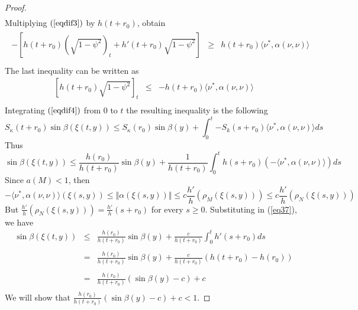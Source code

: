 \documentclass[a4paper]{amsart}
\theoremstyle{definition}
\numberwithin{equation}{section}
\begin{document}
\begin{proof}
\begin{equation}
\begin{array}{ccl}
\end{array}
\end{equation}
Multiplying $(\ref{eqdif3})$ by $h(t + r_0)$, obtain
\begin{eqnarray*}
\begin{array}{ccl}
-\left[h(t + r_0)(\sqrt{1 - \psi^2})_t + h'(t + r_0)\sqrt{1 - \psi^2} \right]&\geq& h(t + r_0)\langle
\nu^*,\alpha(\nu,\nu)\rangle\\
\end{array}
\end{eqnarray*}
The last inequality  can be written as
\begin{equation}\label{eqdif4}
\begin{array}{ccl}
\left[h(t + r_0)\sqrt{1 - \psi^2}\right]_t &\leq& - h(t + r_0) \langle \nu^*,\alpha(\nu,\nu)\rangle\\
\end{array}
\end{equation}
Integrating  $(\ref{eqdif4})$ from $0$ to $t$ the resulting inequality
is the following
\[
S_{\kappa}(t + r_0)\sin\beta(\xi(t,y)) \leq S_{\kappa}(r_0)\sin\beta(y) + \int_0^t{-S_k(s + r_0)\langle\nu^*,\alpha(\nu,\nu)\rangle ds}
\]
Thus
\begin{equation}\label{eq37}
\sin\beta (\xi(t,y)) \leq\frac{h(r_0)}{h(t + r_0)}\sin\beta(y) + \frac{1}{h(t + r_0)}\int_0^t{h(s +
r_0)(-\langle\nu^*,\alpha(\nu,\nu)\rangle) ds}
\end{equation}
Since  $a(M)< 1$, then
\[
- \langle\nu^*,\alpha(\nu,\nu)\rangle(\xi(s,y)) \leq \Vert\alpha(\xi(s,y))\Vert \leq c \frac{h'}{h}(\rho_{M}(\xi(s,y))) \leq  c
\frac{h'}{h}(\rho_{N}(\xi(s,y))) 
\]But $\displaystyle\frac{h'}{h}(\rho_{N}(\xi(s,y))) = \frac{h'}{h}(s + r_0)$
for every $s \geq 0$. Substituting in (\ref{eq37}), we have
\begin{equation}\label{eq39}
\begin{array}{ccl}
\sin\beta(\xi(t,y))&\leq&\displaystyle\frac{h(r_0)}{h(t + r_0)}\sin\beta(y) + \frac{c}{h(t + r_0)}\int_0^t h'(s +
r_0)ds\\
\\
&=&\displaystyle\frac{h(r_0)}{h(t + r_0)}\sin\beta(y) + \displaystyle\frac {c}{h(t + r_0)}(h(t + r_0)-
h(r_0))\\
\\
&=&\displaystyle\frac{h(r_0)}{h(t + r_0)}(\sin\beta(y) - c) +c \\
\end{array}
\end{equation}
We will show that $\displaystyle\frac{h(r_0)}{h(t + r_0)}(\sin\beta(y) - c) +c  < 1$.

\end{proof}
\end{document}
